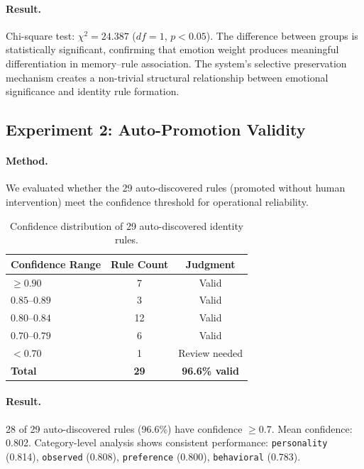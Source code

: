 \documentclass[11pt,a4paper]{article}
\begin{document}
\paragraph{Result.} Chi-square test: $\chi^2 = 24.387$ ($df = 1$, $p < 0.05$). The difference between groups is statistically significant, confirming that emotion weight produces meaningful differentiation in memory--rule association. The system's selective preservation mechanism creates a non-trivial structural relationship between emotional significance and identity rule formation.

\subsection{Experiment 2: Auto-Promotion Validity}

\paragraph{Method.} We evaluated whether the 29 auto-discovered rules (promoted without human intervention) meet the confidence threshold for operational reliability.

\begin{table}[h]
\centering
\caption{Confidence distribution of 29 auto-discovered identity rules.}
\label{tab:exp2}
\small
\begin{tabular}{@{}lcc@{}}
\toprule
\textbf{Confidence Range} & \textbf{Rule Count} & \textbf{Judgment} \\
\midrule
$\geq 0.90$ & 7 & Valid \\
$0.85$--$0.89$ & 3 & Valid \\
$0.80$--$0.84$ & 12 & Valid \\
$0.70$--$0.79$ & 6 & Valid \\
$< 0.70$ & 1 & Review needed \\
\midrule
\textbf{Total} & \textbf{29} & \textbf{96.6\% valid} \\
\bottomrule
\end{tabular}
\end{table}

\paragraph{Result.} 28 of 29 auto-discovered rules (96.6\%) have confidence $\geq 0.7$. Mean confidence: 0.802. Category-level analysis shows consistent performance: \texttt{personality} (0.814), \texttt{observed} (0.808), \texttt{preference} (0.800), \texttt{behavioral} (0.783).
\end{document}
